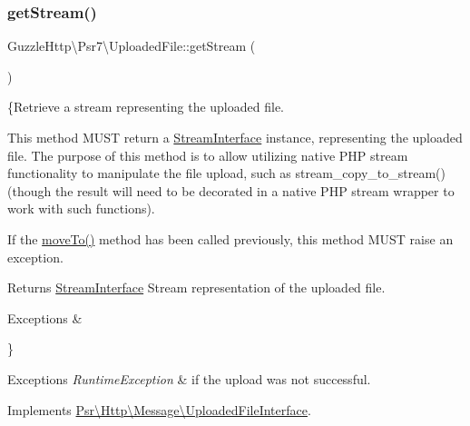\subsubsection{\texorpdfstring{get\+Stream()}{getStream()}}
{\footnotesize\ttfamily Guzzle\+Http\textbackslash{}\+Psr7\textbackslash{}\+Uploaded\+File\+::get\+Stream (\begin{DoxyParamCaption}{ }\end{DoxyParamCaption})}

\{Retrieve a stream representing the uploaded file.

This method M\+U\+ST return a \hyperlink{interfacePsr_1_1Http_1_1Message_1_1StreamInterface}{Stream\+Interface} instance, representing the uploaded file. The purpose of this method is to allow utilizing native P\+HP stream functionality to manipulate the file upload, such as stream\+\_\+copy\+\_\+to\+\_\+stream() (though the result will need to be decorated in a native P\+HP stream wrapper to work with such functions).

If the \hyperlink{interfacePsr_1_1Http_1_1Message_1_1UploadedFileInterface_aac862c26ca280245c0fb197d0266fdf4}{move\+To()} method has been called previously, this method M\+U\+ST raise an exception.

\begin{DoxyReturn}{Returns}
\hyperlink{interfacePsr_1_1Http_1_1Message_1_1StreamInterface}{Stream\+Interface} Stream representation of the uploaded file. 
\end{DoxyReturn}

\begin{DoxyExceptions}{Exceptions}
{\em } & \\
\hline
\end{DoxyExceptions}
\} 
\begin{DoxyExceptions}{Exceptions}
{\em Runtime\+Exception} & if the upload was not successful. \\
\hline
\end{DoxyExceptions}


Implements \hyperlink{interfacePsr_1_1Http_1_1Message_1_1UploadedFileInterface_a342c7814f65c2b256dc525bc3063d662}{Psr\textbackslash{}\+Http\textbackslash{}\+Message\textbackslash{}\+Uploaded\+File\+Interface}.

\mbox{\label{classGuzzleHttp_1_1Psr7_1_1UploadedFile_a1239a84cc43c30dd3ecfeac12a84d945}} 
